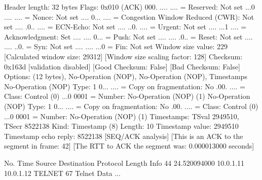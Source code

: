     Header length: 32 bytes
    Flags: 0x010 (ACK)
        000. .... .... = Reserved: Not set
        ...0 .... .... = Nonce: Not set
        .... 0... .... = Congestion Window Reduced (CWR): Not set
        .... .0.. .... = ECN-Echo: Not set
        .... ..0. .... = Urgent: Not set
        .... ...1 .... = Acknowledgment: Set
        .... .... 0... = Push: Not set
        .... .... .0.. = Reset: Not set
        .... .... ..0. = Syn: Not set
        .... .... ...0 = Fin: Not set
    Window size value: 229
    [Calculated window size: 29312]
    [Window size scaling factor: 128]
    Checksum: 0x163d [validation disabled]
        [Good Checksum: False]
        [Bad Checksum: False]
    Options: (12 bytes), No-Operation (NOP), No-Operation (NOP), Timestamps
        No-Operation (NOP)
            Type: 1
                0... .... = Copy on fragmentation: No
                .00. .... = Class: Control (0)
                ...0 0001 = Number: No-Operation (NOP) (1)
        No-Operation (NOP)
            Type: 1
                0... .... = Copy on fragmentation: No
                .00. .... = Class: Control (0)
                ...0 0001 = Number: No-Operation (NOP) (1)
        Timestamps: TSval 2949510, TSecr 8522138
            Kind: Timestamp (8)
            Length: 10
            Timestamp value: 2949510
            Timestamp echo reply: 8522138
    [SEQ/ACK analysis]
        [This is an ACK to the segment in frame: 42]
        [The RTT to ACK the segment was: 0.000013000 seconds]

No.     Time           Source                Destination           Protocol Length Info
     44 24.520094000   10.0.1.11             10.0.1.12             TELNET   67     Telnet Data ...

